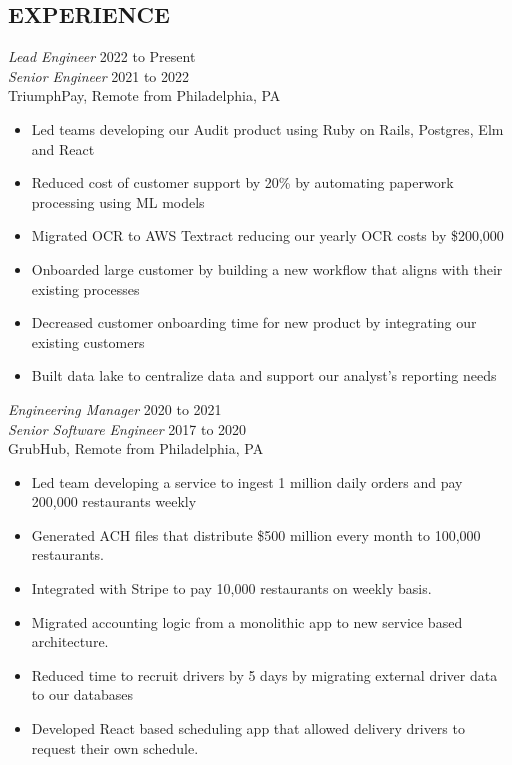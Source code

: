 \documentclass[line]{style}
\begin{document}
\newsectionwidth{0in}

\address{michaelcdalton@gmail.com}
\address{linkedin.com/in/michaelcdalton}

\begin{resume}

\section{EXPERIENCE}

{\sl Lead Engineer} \hfill 2022 to Present \\
{\sl Senior Engineer} \hfill 2021 to 2022 \\
TriumphPay, Remote from Philadelphia, PA
\begin{itemize} \itemsep -2pt
\item Led teams developing our Audit product using Ruby on Rails, Postgres, Elm and React
\item Reduced cost of customer support by 20\% by automating paperwork processing using ML models
\item Migrated OCR to AWS Textract reducing our yearly OCR costs by \$200,000
\item Onboarded large customer by building a new workflow that aligns with their existing processes
\item Decreased customer onboarding time for new product by integrating our existing customers
\item Built data lake to centralize data and support our analyst's reporting needs
\end{itemize}

{\sl Engineering Manager} \hfill 2020 to 2021 \\
{\sl Senior Software Engineer} \hfill 2017 to 2020 \\
GrubHub, Remote from Philadelphia, PA
\begin{itemize} \itemsep -2pt
\item Led team developing a service to ingest 1 million daily orders and pay 200,000 restaurants weekly
\item Generated ACH files that distribute \$500 million every month to 100,000 restaurants.
\item Integrated with Stripe to pay 10,000 restaurants on weekly basis.
\item Migrated accounting logic from a monolithic app to new service based architecture.
\item Reduced time to recruit drivers by 5 days by migrating external driver data to our databases
\item Developed React based scheduling app that allowed delivery drivers to request their own schedule.
\end{itemize}


\end{resume}
\end{document}
